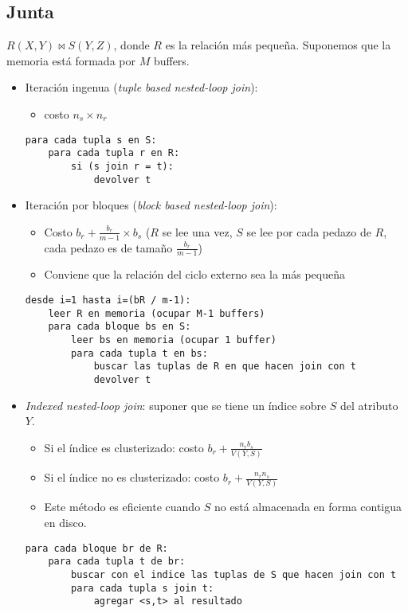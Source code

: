 \documentclass[a4paper, twoside]{article}
\begin{document}
\subsection{Junta}
$R(X,Y)\bowtie S(Y,Z)$, donde $R$ es la relación más pequeña. Suponemos que la memoria está formada por $M$ buffers.

\begin{itemize}
	\item Iteración ingenua (\emph{tuple based nested-loop join}): 
	\begin{itemize}
		\item costo $n_{s}\times n_{r}$
	\end{itemize}

	\begin{lstlisting}
para cada tupla s en S:
	para cada tupla r en R:
		si (s join r = t):
			devolver t
	\end{lstlisting}

	\item Iteración por bloques (\emph{block based nested-loop join}): 
	\begin{itemize}
		\item Costo $b_{r}+\frac{b_{r}}{m-1}\times b_{s}$ ($R$ se lee una vez, $S$ se lee por cada pedazo de $R$, cada pedazo es de tamaño $\frac{b_{r}}{m-1}$)
		\item Conviene que la relación del ciclo externo sea la más pequeña
	\end{itemize}

	\begin{lstlisting}
desde i=1 hasta i=(bR / m-1):
	leer R en memoria (ocupar M-1 buffers)
	para cada bloque bs en S:
		leer bs en memoria (ocupar 1 buffer)
		para cada tupla t en bs:
			buscar las tuplas de R en que hacen join con t
			devolver t
	\end{lstlisting}

	\item \emph{Indexed nested-loop join}: suponer que se tiene un índice sobre $S$ del atributo $Y$.
	\begin{itemize}
		\item Si el índice es clusterizado: costo $b_{r}+\frac{n_{r}b_{s}}{V(Y,S)}$
		\item Si el índice no es clusterizado: costo $b_{r}+\frac{n_{r}n_{s}}{V(Y,S)}$
		\item Este método es eficiente cuando $S$ no está almacenada en forma contigua en disco.
	\end{itemize}

	\begin{lstlisting}
para cada bloque br de R:
	para cada tupla t de br:
		buscar con el indice las tuplas de S que hacen join con t
		para cada tupla s join t:
			agregar <s,t> al resultado
	\end{lstlisting}


\end{itemize}
\end{document}
